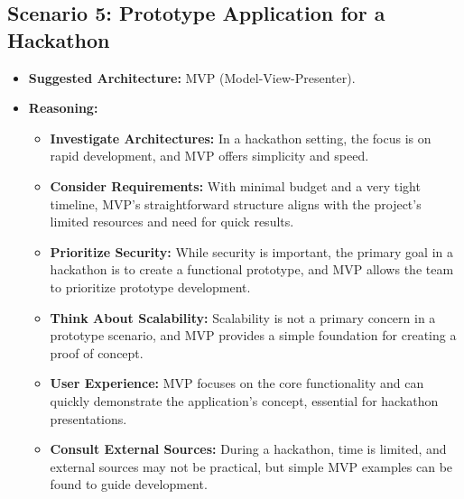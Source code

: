 \subsection*{Scenario 5: Prototype Application for a Hackathon}
\begin{itemize}
	\item \textbf{Suggested Architecture:} MVP (Model-View-Presenter).
	\item \textbf{Reasoning:}
	\begin{itemize}
		\item \textbf{Investigate Architectures:} In a hackathon setting, the focus is on rapid development, and MVP offers simplicity and speed.
		\item \textbf{Consider Requirements:} With minimal budget and a very tight timeline, MVP's straightforward structure aligns with the project's limited resources and need for quick results.
		\item \textbf{Prioritize Security:} While security is important, the primary goal in a hackathon is to create a functional prototype, and MVP allows the team to prioritize prototype development.
		\item \textbf{Think About Scalability:} Scalability is not a primary concern in a prototype scenario, and MVP provides a simple foundation for creating a proof of concept.
		\item \textbf{User Experience:} MVP focuses on the core functionality and can quickly demonstrate the application's concept, essential for hackathon presentations.
		\item \textbf{Consult External Sources:} During a hackathon, time is limited, and external sources may not be practical, but simple MVP examples can be found to guide development.
	\end{itemize}
\end{itemize}